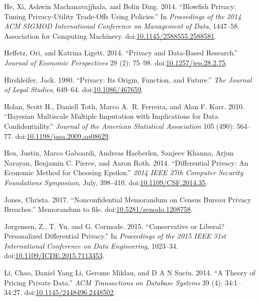 \documentclass[]{article}
\begin{document}
\hypertarget{ref-He:Blowfish:ACMSIGMOD:2014}{}
He, Xi, Ashwin Machanavajjhala, and Bolin Ding. 2014. ``Blowfish
Privacy: Tuning Privacy-Utility Trade-Offs Using Policies.'' In
\emph{Proceedings of the 2014 ACM SIGMOD International Conference on
Management of Data}, 1447--58. Association for Computing Machinery.
doi:\href{https://doi.org/10.1145/2588555.2588581}{10.1145/2588555.2588581}.

\hypertarget{ref-Heffetz2014}{}
Heffetz, Ori, and Katrina Ligett. 2014. ``Privacy and Data-Based
Research.'' \emph{Journal of Economic Perspectives} 28 (2): 75--98.
doi:\href{https://doi.org/10.1257/jep.28.2.75}{10.1257/jep.28.2.75}.

\hypertarget{ref-hirshleifer1980privacy}{}
Hirshleifer, Jack. 1980. ``Privacy: Its Origin, Function, and Future.''
\emph{The Journal of Legal Studies}, 649--64.
doi:\href{https://doi.org/10.1086/467659}{10.1086/467659}.

\hypertarget{ref-Holan2010}{}
Holan, Scott H., Daniell Toth, Marco A.~R. Ferreira, and Alan F. Karr.
2010. ``Bayesian Multiscale Multiple Imputation with Implications for
Data Confidentiality.'' \emph{Journal of the American Statistical
Association} 105 (490): 564--77.
doi:\href{https://doi.org/10.1198/jasa.2009.ap08629}{10.1198/jasa.2009.ap08629}.

\hypertarget{ref-Hsu:EconomicEpsilon:IEEE:2014}{}
Hsu, Justin, Marco Gaboardi, Andreas Haeberlen, Sanjeev Khanna, Arjun
Narayan, Benjamin C. Pierce, and Aaron Roth. 2014. ``Differential
Privacy: An Economic Method for Choosing Epsilon.'' \emph{2014 IEEE 27th
Computer Security Foundations Symposium}, July, 398--410.
doi:\href{https://doi.org/10.1109/CSF.2014.35}{10.1109/CSF.2014.35}.

\hypertarget{ref-jones:2017}{}
Jones, Christa. 2017. ``Nonconfidential Memorandum on Census Bureau
Privacy Breaches.'' Memorandum to file.
doi:\href{https://doi.org/10.5281/zenodo.1208758}{10.5281/zenodo.1208758}.

\hypertarget{ref-jorgensen:personalized:ICDE:2015}{}
Jorgensen, Z., T. Yu, and G. Cormode. 2015. ``Conservative or Liberal?
Personalized Differential Privacy.'' In \emph{Proceedings of the 2015
IEEE 31st International Conference on Data Engineering}, 1023--34.
doi:\href{https://doi.org/10.1109/ICDE.2015.7113353}{10.1109/ICDE.2015.7113353}.

\hypertarget{ref-Li2014}{}
Li, Chao, Daniel Yang Li, Gerome Miklau, and D A N Suciu. 2014. ``A
Theory of Pricing Private Data.'' \emph{ACM Transactions on Database
Systems} 39 (4): 34:1--34:27.
doi:\href{https://doi.org/10.1145/2448496.2448502}{10.1145/2448496.2448502}.
\end{document}
